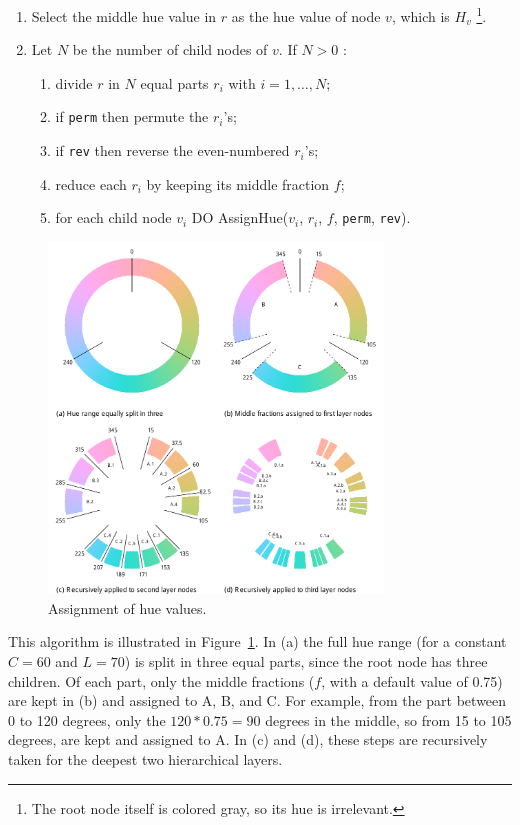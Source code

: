 \documentclass[journal]{vgtc}                %
\begin{document}
%
\begin{enumerate} \itemsep1pt \parskip0pt 
\item Select the middle hue value in $r$ as the hue value of node $v$, which is $H_v$ \footnote{The root node itself is colored gray, so its hue is irrelevant.}.
\item Let $N$ be the number of child nodes of $v$. If $N>0$ :
\begin{enumerate}[i] \itemsep1pt \parskip0pt 
\item divide $r$ in $N$ equal parts $r_i$ with $i=1,\ldots,N$;
\item if \texttt{perm} then permute the $r_i$'s;
\item if \texttt{rev} then reverse the even-numbered $r_i$'s;
\item reduce each $r_i$ by keeping its middle fraction $f$;
\item for each child node $v_i$ DO AssignHue($v_i$, $r_i$, $f$, \texttt{perm}, \texttt{rev}).
\end{enumerate}
\end{enumerate}

\begin{figure}[tb]
  \centering
  \includegraphics[width=3.5in]{hcl_method2.pdf}
  \caption{Assignment of hue values.}\label{fig:wheel}
\end{figure}

This algorithm is illustrated in Figure~\ref{fig:wheel}. In (a) the full hue range (for a constant $C=60$ and $L=70$)  is split in three equal parts, since the root node has three children. Of each part, only the middle fractions ($f$, with a default value of 0.75) are kept in (b) and assigned to A, B, and C. For example, from the part between 0 to 120 degrees, only the $120*0.75=90$ degrees in the middle, so from 15 to 105 degrees, are kept and assigned to A. In (c) and (d), these steps are recursively taken for the deepest two hierarchical layers.
\end{document}
